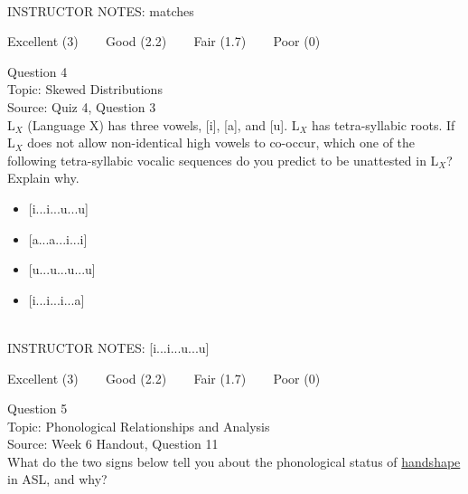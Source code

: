 \documentclass[12pt]{article}
\begin{document}
~\\
INSTRUCTOR NOTES: matches


\vfill
Excellent (3) ~~~ Good (2.2) ~~~ Fair (1.7) ~~~ Poor (0)
\newpage

{\large Question 4}\\

Topic: Skewed Distributions\\
Source: Quiz 4, Question 3\\

L$_X$ (Language X) has three vowels, [i], [a], and [u]. L$_X$ has tetra-syllabic roots. If L$_X$ does not allow non-identical high vowels to co-occur, which one of the following tetra-syllabic vocalic sequences do you predict to be unattested in L$_X$? Explain why.\\

\begin{itemize} \item {[i...i...u...u]} \item {[a...a...i...i]} \item {[u...u...u...u]} \item {[i...i...i...a]} \end{itemize}


~\\
INSTRUCTOR NOTES: [i...i...u...u]


\vfill
Excellent (3) ~~~ Good (2.2) ~~~ Fair (1.7) ~~~ Poor (0)
\newpage

{\large Question 5}\\

Topic: Phonological Relationships and Analysis\\
Source: Week 6 Handout, Question 11\\

What do the two signs below tell you about the phonological status of \underline{handshape} in ASL, and why?\\
\end{document}
